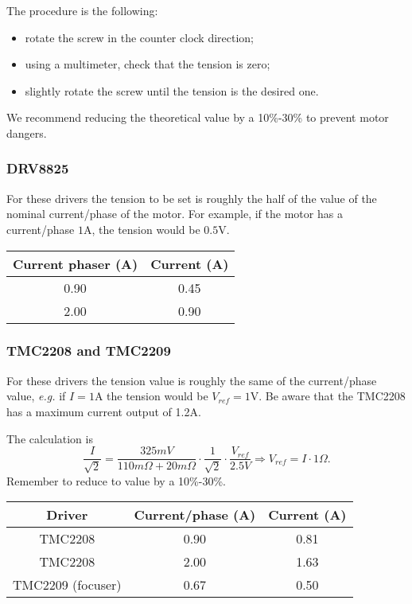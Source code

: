 The procedure is the following:
\begin{itemize}
    \item rotate the screw in the counter clock direction;
    \item using a multimeter, check that the tension is zero;
    \item slightly rotate the screw until the tension is the desired one.
\end{itemize}
We recommend reducing the theoretical value by a 10\%-30\% to prevent motor dangers.

\subsubsection{DRV8825}
For these drivers the tension to be set is roughly the half of the value of the nominal current/phase of the motor.
For example, if the motor has a current/phase \(1\)A, the tension would be \(0.5\)V.

\begin{minipage}
    {.4\textwidth}
    \begin{tabular}{cc}
        Current phaser (A) & Current (A) \\
        \hline
        0.90 & 0.45 \\
        2.00 & 0.90             
    \end{tabular}
    \label{tab:drivers_curr}
\end{minipage} 

\subsubsection{TMC2208 and TMC2209}
For these drivers the tension value is roughly the same of the current/phase value, \textit{e.g.} if \(I=1\)A the tension would be \(V_{ref}=1\)V.
Be aware that the TMC2208 has a maximum current output of 1.2A.

The calculation is 
\[\frac{I}{\sqrt{2}}=\frac{325mV}{110m\Omega+20m\Omega}\cdot\frac{1}{\sqrt{2}}\cdot\frac{V_{ref}}{2.5V}\Rightarrow V_{ref} = I \cdot 1\Omega.\]
Remember to reduce to value by a 10\%-30\%.

\begin{minipage}
    {.4\textwidth}
    \begin{tabular}{ccc}
       Driver & Current/phase (A) & Current (A) \\
        \hline
       TMC2208 & 0.90 & 0.81 \\
       TMC2208 & 2.00 & 1.63 \\                
       TMC2209 (focuser) & 0.67 & 0.50                
    \end{tabular}
    \label{tab:drivers_curr}
\end{minipage} 


